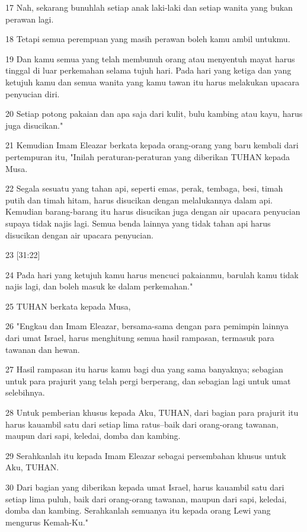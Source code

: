 \par 17 Nah, sekarang bunuhlah setiap anak laki-laki dan setiap wanita yang bukan perawan lagi.
\par 18 Tetapi semua perempuan yang masih perawan boleh kamu ambil untukmu.
\par 19 Dan kamu semua yang telah membunuh orang atau menyentuh mayat harus tinggal di luar perkemahan selama tujuh hari. Pada hari yang ketiga dan yang ketujuh kamu dan semua wanita yang kamu tawan itu harus melakukan upacara penyucian diri.
\par 20 Setiap potong pakaian dan apa saja dari kulit, bulu kambing atau kayu, harus juga disucikan."
\par 21 Kemudian Imam Eleazar berkata kepada orang-orang yang baru kembali dari pertempuran itu, "Inilah peraturan-peraturan yang diberikan TUHAN kepada Musa.
\par 22 Segala sesuatu yang tahan api, seperti emas, perak, tembaga, besi, timah putih dan timah hitam, harus disucikan dengan melalukannya dalam api. Kemudian barang-barang itu harus disucikan juga dengan air upacara penyucian supaya tidak najis lagi. Semua benda lainnya yang tidak tahan api harus disucikan dengan air upacara penyucian.
\par 23 [31:22]
\par 24 Pada hari yang ketujuh kamu harus mencuci pakaianmu, barulah kamu tidak najis lagi, dan boleh masuk ke dalam perkemahan."
\par 25 TUHAN berkata kepada Musa,
\par 26 "Engkau dan Imam Eleazar, bersama-sama dengan para pemimpin lainnya dari umat Israel, harus menghitung semua hasil rampasan, termasuk para tawanan dan hewan.
\par 27 Hasil rampasan itu harus kamu bagi dua yang sama banyaknya; sebagian untuk para prajurit yang telah pergi berperang, dan sebagian lagi untuk umat selebihnya.
\par 28 Untuk pemberian khusus kepada Aku, TUHAN, dari bagian para prajurit itu harus kauambil satu dari setiap lima ratus--baik dari orang-orang tawanan, maupun dari sapi, keledai, domba dan kambing.
\par 29 Serahkanlah itu kepada Imam Eleazar sebagai persembahan khusus untuk Aku, TUHAN.
\par 30 Dari bagian yang diberikan kepada umat Israel, harus kauambil satu dari setiap lima puluh, baik dari orang-orang tawanan, maupun dari sapi, keledai, domba dan kambing. Serahkanlah semuanya itu kepada orang Lewi yang mengurus Kemah-Ku."
